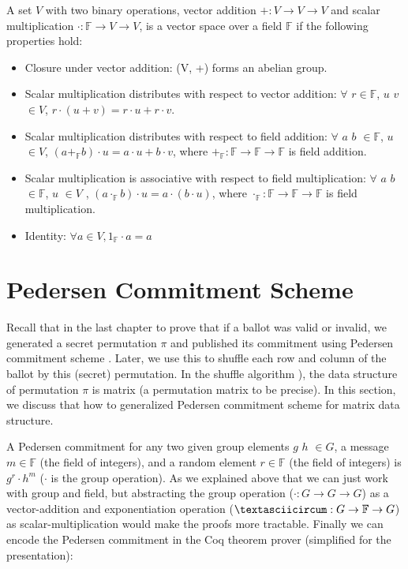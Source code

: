  

\begin{definition}
A set $V$ with two binary operations,  vector addition $+ : V \rightarrow V \rightarrow V$  and scalar multiplication $\cdot : \mathbb{F}  \rightarrow V \rightarrow V$, 
is  a vector space over a field $\mathbb{F}$ if the following properties hold:
\end{definition} 
\begin{itemize}
 \item Closure under vector addition: (V, +) forms an abelian group. 
 \item Scalar multiplication distributes  with respect  to  vector  addition: $\forall$  $r \in \mathbb{F}$, $u$ $v$ $\in V$,  $r \cdot (u + v) = r \cdot u + r \cdot v$.
 \item Scalar multiplication distributes with respect to field addition: 
                $\forall$  $a$ $b$ $\in \mathbb{F}$, $u$ $\in V$, $(a +_{\mathbb{F}} b) \cdot u = a \cdot u + b \cdot v$, where $+_{\mathbb{F}} : \mathbb{F} \to \mathbb{F} \to \mathbb{F} $ is 
                field addition. 
  \item Scalar multiplication is associative with respect to field multiplication:
         $\forall$ $a$ $b$ $\in  \mathbb{F}$, $u$ $\in V$ , $(a \cdot_{\mathbb{F}} b) \cdot u = a \cdot (b \cdot u)$, where $\cdot_{\mathbb{F}} : \mathbb{F} \to \mathbb{F} \to \mathbb{F} $ is 
                field  multiplication. 
  \item Identity: $\forall a \in V, 1_{\mathbb{F}} \cdot a = a$

\end{itemize}



\section{Pedersen Commitment Scheme}
\label{sec:pedersen}
Recall that in the last chapter to prove that if a ballot was valid or invalid, we generated a secret permutation $\pi$ and published its commitment using 
Pedersen commitment scheme \citep{Pederson}.  Later, we use this to shuffle each row and column of the ballot by this (secret) permutation. 
In the shuffle algorithm \citep{Wikstrom:2009:CPS}), the data structure of permutation $\pi$ is matrix (a permutation matrix to be precise).
In this section, we discuss that how to generalized Pedersen commitment scheme for matrix data structure. 

A Pedersen commitment for any two given group elements $g$ $h$ $\in G$, a message $m \in \mathbb{F}$ (the field of integers), and a random element 
$r \in \mathbb{F}$ (the field of integers) is $g^r \cdot h^m$ ($\cdot$ is the group operation).   
As we explained above that we can just work with group and field, but abstracting the group operation ($\cdot : G \to G \to G$) as 
a vector-addition and exponentiation operation ($\textasciicircum :  G \to \mathbb{F} \to G$) as scalar-multiplication would make the 
proofs more tractable.  Finally we can encode the Pedersen commitment in the Coq 
theorem prover (simplified for the presentation):

